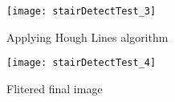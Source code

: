 \begin{figure}[H]
  \centering
    \begin{multicols}{2}
        \texttt{[image: stairDetectTest\_3]}
        \caption{Applying Hough Lines algorithm}
        \label{fig:horizontalLinesRaw}
        
        \texttt{[image: stairDetectTest\_4]}
        \caption{Flitered final image}
        \label{fig:horizontalLinesFiltered}
    \end{multicols}     
\end{figure}
